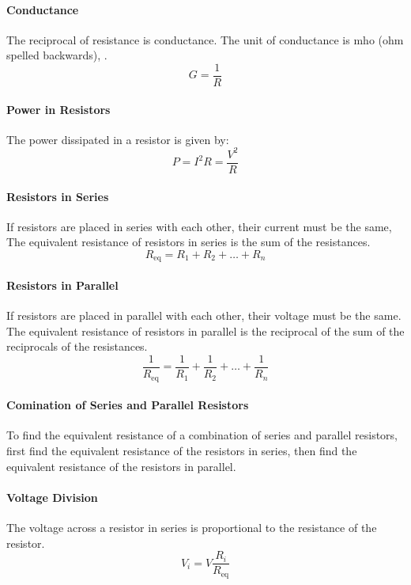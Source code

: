 \documentclass[11pt]{article}
\begin{document}
\paragraph{Conductance} The reciprocal of resistance is conductance. The unit of conductance is mho (ohm spelled backwards), .
\begin{equation}
    G = \frac{1}{R}
\end{equation}
\paragraph{Power in Resistors} The power dissipated in a resistor is given by:
\begin{equation}
    P = I^2R = \frac{V^2}{R}
\end{equation}
\paragraph{Resistors in Series} If resistors are placed in series with each other, their current must be the same, The equivalent resistance of resistors in series is the sum of the resistances.
\begin{equation}
    R_{\text{eq}} = R_1 + R_2 + \dots + R_n
\end{equation}
\paragraph{Resistors in Parallel} If resistors are placed in parallel with each other, their voltage must be the same. The equivalent resistance of resistors in parallel is the reciprocal of the sum of the reciprocals of the resistances.
\begin{equation}
    \frac{1}{R_{\text{eq}}} = \frac{1}{R_1} + \frac{1}{R_2} + \dots + \frac{1}{R_n}
\end{equation}
\paragraph{Comination of Series and Parallel Resistors} To find the equivalent resistance of a combination of series and parallel resistors, first find the equivalent resistance of the resistors in series, then find the equivalent resistance of the resistors in parallel.
\paragraph{Voltage Division} The voltage across a resistor in series is proportional to the resistance of the resistor.
\begin{equation}
    V_i = V \frac{R_i}{R_{\text{eq}}}
\end{equation}
\end{document}
